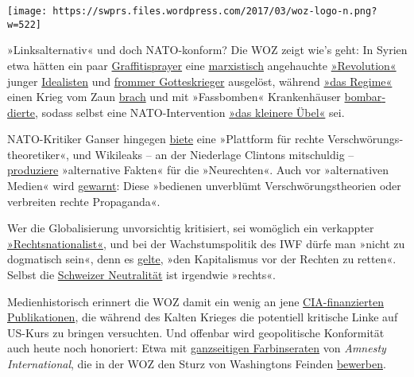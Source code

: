 \texttt{[image: https://swprs.files.wordpress.com/2017/03/woz-logo-n.png?w=522]}

»Linksalternativ« und doch NATO-konform? Die WOZ zeigt wie's geht: In
Syrien etwa hätten ein paar
\href{https://www.woz.ch/1203/syrien/assad-geht-das-licht-aus}{Graffiti­sprayer}
eine
\href{https://www.woz.ch/1616/syriens-zukunft/assads-spiel-mit-dem-westen}{marxis­tisch}
ange­hauchte
\href{https://www.woz.ch/1511/kommentar-von-francois-moore/die-revolution-in-syrien-ist-am-ende}{»Revo­lution«}
junger
\href{https://www.woz.ch/1606/syrien/mithilfe-dieser-verdammten-russen-wird-dieser-bastard-noch-ueberleben}{Idealisten}
und \href{https://www.woz.ch/1235/syrien/kaempfen-und-beten}{frommer
Gottes­krieger} ausgelöst, während
\href{https://www.woz.ch/1324/syrien/ein-land-zersplittert-immer-mehr}{»das
Regime«} einen Krieg vom Zaun
\href{https://www.woz.ch/1321/syrien-und-der-westen/assad-kann-nur-gewinnen}{brach}
und mit »Fass­bomben« Kranken­häuser
\href{https://www.woz.ch/1416/syrien/fassbomben-gottes-wille-und-demokratie}{bombar­dierte},
sodass selbst eine NATO-Inter­vention
\href{https://www.woz.ch/1335/syrien/intervention-als-kleineres-uebel}{»das
kleinere Übel«} sei.

NATO-Kritiker Ganser hingegen
\href{https://www.woz.ch/1703/wahrheit-und-verschwoerung/das-ganser-phaenomen}{biete}
eine »Plattform für rechte Ver­schwö­rungs­theo­retiker«, und Wiki­leaks
-- an der Nieder­lage Clintons mitschuldig --
\href{https://www.woz.ch/1711/cia-dokumente/die-alternativen-fakten-von-wikileaks}{produziere}
»alter­native Fakten« für die »Neurechten«. Auch vor »alter­na­tiven
Medien« wird
\href{https://www.woz.ch/1743/qualitaet-der-medien/unterinformiert-und-ausgeliefert}{gewarnt}:
Diese »bedienen unverblümt Ver­schwörungs­theorien oder ver­breiten
rechte Propaganda«.

Wer die Global­isierung unvor­sichtig kriti­siert, sei womöglich ein
verkappter
\href{https://www.woz.ch/1708/wirtschaftlicher-protektionismus/die-voelkische-kritik-an-der-globalisierung}{»Rechts­nationa­list«},
und bei der Wachs­tums­politik des IWF dürfe man »nicht zu dogma­tisch
sein«, denn es
\href{https://www.woz.ch/1742/weltwirtschaft/die-hueterin-des-kapitalismus}{gelte},
»den Kapita­lismus vor der Rechten zu retten«. Selbst die
\href{https://www.woz.ch/1414/schweizerische-aussenpolitik/opportunistische-neutralitaet}{Schweizer
Neutra­lität} ist irgendwie »rechts«.

Medien­historisch erinnert die WOZ damit ein wenig an jene
\href{https://www.youtube.com/watch?v=3QAgCFjNXJE}{CIA-finanzierten
Publika­tionen}, die während des Kalten Krieges die potentiell kritische
Linke auf US-Kurs zu bringen versuchten. Und offenbar wird
geo­poli­tische Konfor­mität auch heute noch honoriert: Etwa mit
\href{https://swprs.files.wordpress.com/2017/10/amnesty-international-werbung.png}{ganz­seitigen
Farb­inseraten} von \emph{Amnesty Inter­national}, die in der WOZ den
Sturz von Washingtons Feinden
\href{https://consortiumnews.com/2012/06/18/amnestys-shilling-for-us-wars/}{bewerben}.

